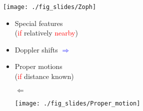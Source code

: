 \documentclass[xcolor=dvipsnames,professionalfonts, aspectratio=169]{beamer}
\begin{document}
\begin{frame}
  \begin{center}
    \begin{minipage}[hb]{0.25\linewidth}
      \vspace*{-95pt}
      \texttt{[image: ./fig\_slides/Zoph]}\\
    \end{minipage} \vspace*{30pt}
    \begin{minipage}[hb]{0.4\linewidth}
      \begin{itemize}\Large
      \item<1->[$\Leftarrow$] Special features\\
        {\small \centering (\textcolor{red}{if} relatively \textcolor{red}{nearby})}
        \vspace*{5pt}
      \item<2->[] Doppler shifts \hfill
        \textcolor{Blue}{$\Rightarrow$}
        \vspace*{5pt}
      \item<3>[] Proper motions\\
        {\small \centering (\textcolor{red}{if} distance known)}
        \begin{center}
          \begin{sideways}
            $\Leftarrow$
          \end{sideways}
          \linebreak \hspace*{-20pt}\texttt{[image: ./fig\_slides/Proper\_motion]}
        \end{center}
      \end{itemize}
    \end{minipage}
\end{center}
\end{frame}
\end{document}
